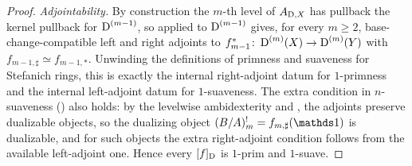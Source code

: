 \documentclass[11pt]{book}
\begin{document}
	\begin{proof}
		\emph{Adjointability.} By construction the $m$-th level of $A_{\operatorname{\mathrm{D}},X}$ has pullback the kernel pullback for $\operatorname{\mathrm{D}}^{(m-1)}$, so  applied to $\operatorname{\mathrm{D}}^{(m-1)}$ gives, for every $m\geq 2$, base-change-compatible left and right adjoints to $f_{m-1}^*\colon \operatorname{\mathrm{D}}^{(m)}(X)\to\operatorname{\mathrm{D}}^{(m)}(Y)$ with $f_{m-1,\sharp}\simeq f_{m-1,*}$. Unwinding the definitions of primness and suaveness for Stefanich rings, this is exactly the internal right-adjoint datum for $1$-primness and the internal left-adjoint datum for $1$-suaveness. The extra condition in $n$-suaveness () also holds: by the levelwise ambidexterity and , the adjoints preserve dualizable objects, so the dualizing object $(B/A)^!_m = f_{m,\sharp}(\unit)$ is dualizable, and for such objects the extra right-adjoint condition follows from the available left-adjoint one. Hence every $[f]_{\operatorname{\mathrm{D}}}$ is $1$-prim and $1$-suave.


\end{proof}
\end{document}
